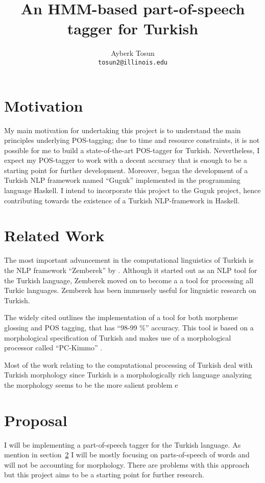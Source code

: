 \documentclass{article}
\title{\bf An HMM-based part-of-speech tagger for Turkish}
\author{Ayberk Tosun\\\texttt{tosun2@illinois.edu}}
\date{}
\begin{document}
\maketitle

\section{Motivation}
\label{sec:motivation}
My main motivation for undertaking this project is to understand the main
principles underlying POS-tagging; due to time and resource constraints, it is
not possible for me to build a state-of-the-art POS-tagger for
Turkish. Nevertheless, I expect my POS-tagger
to work with a decent accuracy that is enough to be a starting point for
further development. Moreover, \citet{Korkut2015} began the development of a
Turkish NLP framework named ``Guguk'' implemented in the programming language Haskell. I intend
to incorporate this project to the Guguk project, hence contributing towards
the existence of a Turkish NLP-framework in Haskell.

\section{Related Work}
\label{sec:related_work}

The most important advancement in the computational linguistics of Turkish is
the NLP framework ``Zemberek'' by \citet{akin2007zemberek}. Although it started
out as an NLP tool for the Turkish language, Zemberek moved on to become a
a tool for processing all Turkic languages. Zemberek has been immensely useful
for linguistic research on Turkish.

The widely cited \citet{oflazer1994tagging} outlines the implementation of a
tool for both morpheme glossing and POS tagging, that has ``98-99 \%'' accuracy. This
tool is based on a morphological specification of Turkish and makes use of a
morphological processor called ``PC-Kimmo'' \citep{antworth1991pc}.

Most of the work relating to the computational processing of Turkish deal with
Turkish morphology since Turkish is a morphologically rich language analyzing
the morphology seems to be the more salient problem e
\section{Proposal}

I will be implementing a part-of-speech tagger for the Turkish language. As
mention in section~\ref{sec:related_work} I will be mostly focusing on parts-of-speech
of words and will not be accounting for morphology. There are problems with this
approach but this project aims to be a starting point for further research.



\end{document}
